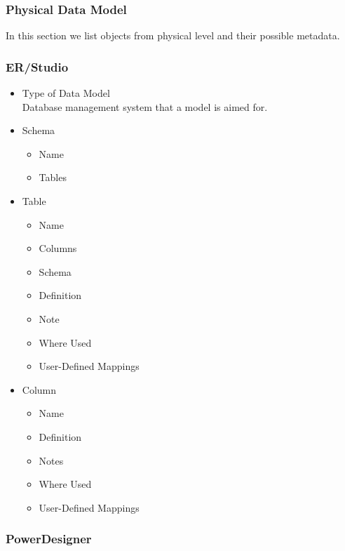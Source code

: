 \subsubsection{Physical Data Model}

In this section we list objects from physical level and their possible metadata.

\subsubsection{ER/Studio}

\begin{itemize}
	\item Type of Data Model\\
	Database management system that a model is aimed for.
	\item Schema
	 \begin{itemize}
	 	\item Name
	 	\item Tables
	 \end{itemize}
	\item Table
	\begin{itemize}
		\item Name
		\item Columns
		\item Schema
		\item Definition
		\item Note
		\item Where Used
		\item User-Defined Mappings
	\end{itemize}
	\item Column
	\begin{itemize}
		\item Name
		\item Definition
		\item Notes
		\item Where Used
		\item User-Defined Mappings
	\end{itemize}
\end{itemize}

\subsubsection{PowerDesigner}

